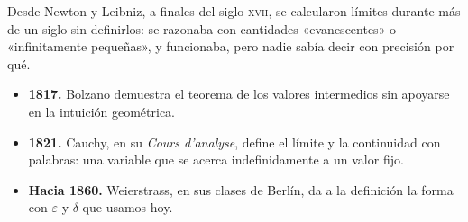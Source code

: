 
\begin{frame}

Desde Newton y Leibniz, a finales del siglo \textsc{xvii}, se calcularon
límites durante más de un siglo sin definirlos: se razonaba con cantidades
«evanescentes» o «infinitamente pequeñas», y funcionaba, pero nadie sabía
decir con precisión por qué.

\begin{itemize}
  \item \textbf{1817.} Bolzano demuestra el teorema de los valores intermedios
        sin apoyarse en la intuición geométrica.
  \item \textbf{1821.} Cauchy, en su \emph{Cours d'analyse}, define el límite
        y la continuidad con palabras: una variable que se acerca
        indefinidamente a un valor fijo.
  \item \textbf{Hacia 1860.} Weierstrass, en sus clases de Berlín, da a la
        definición la forma con $\varepsilon$ y $\delta$ que usamos hoy.
\end{itemize}

\end{frame}
